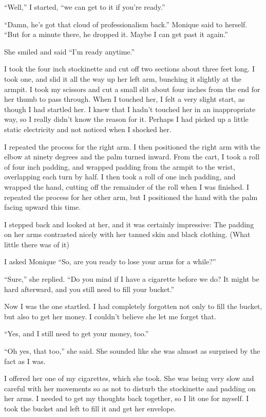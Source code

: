 ``Well,'' I started, ``we can get to it if you're ready.''

\begin{thought}
``Damn, he's got that cloud of professionalism back.'' Monique said to herself. ``But for
a minute there, he dropped it. Maybe I can get past it again.''
\end{thought}

She smiled and said ``I'm ready anytime.''

I took the four inch stockinette and cut off two sections about three feet long. I took
one, and slid it all the way up her left arm, bunching it slightly at the armpit. I took my
scissors and cut a small slit about four inches from the end for her thumb to pass through. When
I touched her, I felt a very slight start, as though I had startled her. I knew that I hadn't
touched her in an inappropriate way, so I really didn't know the reason for it. Perhaps I had
picked up a little static electricity and not noticed when I shocked her.

I repeated the process for the right arm. I then positioned the right arm with the elbow
at ninety degrees and the palm turned inward. From the cart, I took a roll of four inch padding,
and wrapped padding from the armpit to the wrist, overlapping each turn by half. I then took a
roll of one inch padding, and wrapped the hand, cutting off the remainder of the roll when I was
finished. I repeated the process for her other arm, but I positioned the hand with the palm
facing upward this time.

I stepped back and looked at her, and it was certainly impressive: The padding on her arms
contrasted nicely with her tanned skin and black clothing. (What little there was of it)

I asked Monique ``So, are you ready to lose your arms for a while?''

``Sure,'' she replied. ``Do you mind if I have a cigarette before we do? It might be hard
afterward, and you still need to fill your bucket.''

Now I was the one startled. I had completely forgotten not only to fill the bucket, but
also to get her money. I couldn't believe she let me forget that.

``Yes, and I still need to get your money, too.''

``Oh yes, that too,'' she said. She sounded like she was almost as surprised by the fact
as I was.

I offered her one of my cigarettes, which she took. She was being very slow and careful
with her movements so as not to disturb the stockinette and padding on her arms. I needed to get
my thoughts back together, so I lit one for myself. I took the bucket and left to fill it and
get her envelope.

